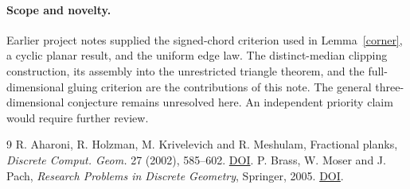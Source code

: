 \documentclass[11pt]{article}
\begin{document}
\paragraph{Scope and novelty.} Earlier project notes supplied the signed-chord criterion used in Lemma~\ref{corner}, a cyclic planar result, and the uniform edge law. The distinct-median clipping construction, its assembly into the unrestricted triangle theorem, and the full-dimensional gluing criterion are the contributions of this note. The general three-dimensional conjecture remains unresolved here. An independent priority claim would require further review.
\begin{thebibliography}{9}
 R. Aharoni, R. Holzman, M. Krivelevich and R. Meshulam, Fractional planks, \emph{Discrete Comput. Geom.} 27 (2002), 585--602. \href{https://doi.org/10.1007/s00454-001-0088-x}{DOI}.
 P. Brass, W. Moser and J. Pach, \emph{Research Problems in Discrete Geometry}, Springer, 2005. \href{https://doi.org/10.1007/0-387-29929-7}{DOI}.
\end{thebibliography}
\end{document}
